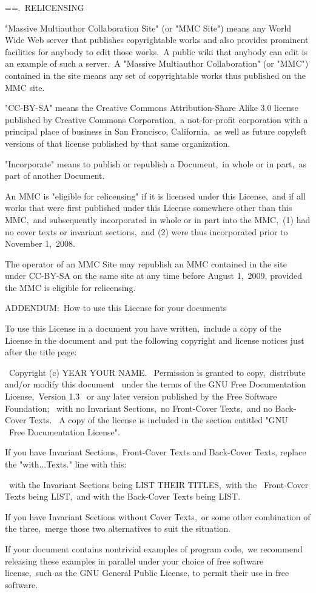 \documentclass{book}
\makeatletter
\newenvironment{Texinfopreformatted}{%
  \par\GNUTobeylines\obeyspaces\frenchspacing\parskip=\z@\parindent=\z@}{}
{\catcode`\^^M=13 \gdef\GNUTobeylines{\catcode`\^^M=13 \def^^M{\null\par}}}
\newenvironment{Texinfoindented}{\begin{list}{}{}\item\relax}{\end{list}}
\renewcommand{\_}{\Texinfounderscore\discretionary{}{}{}}
\makeatother
\begin{document}
\begin{Texinfoindented}
\begin{Texinfopreformatted}
11.\ RELICENSING

"Massive Multiauthor Collaboration Site" (or "MMC Site") means any
World Wide Web server that publishes copyrightable works and also
provides prominent facilities for anybody to edit those works.\  A
public wiki that anybody can edit is an example of such a server.\  A
"Massive Multiauthor Collaboration" (or "MMC") contained in the site
means any set of copyrightable works thus published on the MMC site.

"CC-BY-SA" means the Creative Commons Attribution-Share Alike 3.0
license published by Creative Commons Corporation,\ a not-for-profit
corporation with a principal place of business in San Francisco,
California,\ as well as future copyleft versions of that license
published by that same organization.

"Incorporate" means to publish or republish a Document,\ in whole or in
part,\ as part of another Document.

An MMC is "eligible for relicensing" if it is licensed under this
License,\ and if all works that were first published under this License
somewhere other than this MMC,\ and subsequently incorporated in whole or
in part into the MMC,\ (1) had no cover texts or invariant sections,\ and
(2) were thus incorporated prior to November 1,\ 2008.

The operator of an MMC Site may republish an MMC contained in the site
under CC-BY-SA on the same site at any time before August 1,\ 2009,
provided the MMC is eligible for relicensing.


ADDENDUM:\ How to use this License for your documents

To use this License in a document you have written,\ include a copy of
the License in the document and put the following copyright and
license notices just after the title page:

\    Copyright (c)  YEAR  YOUR NAME.
\    Permission is granted to copy,\ distribute and/or modify this document
\    under the terms of the GNU Free Documentation License,\ Version 1.3
\    or any later version published by the Free Software Foundation;
\    with no Invariant Sections,\ no Front-Cover Texts,\ and no Back-Cover Texts.
\    A copy of the license is included in the section entitled "GNU
\    Free Documentation License".

If you have Invariant Sections,\ Front-Cover Texts and Back-Cover Texts,
replace the "with...Texts." line with this:

\    with the Invariant Sections being LIST THEIR TITLES,\ with the
\    Front-Cover Texts being LIST,\ and with the Back-Cover Texts being LIST.

If you have Invariant Sections without Cover Texts,\ or some other
combination of the three,\ merge those two alternatives to suit the
situation.

If your document contains nontrivial examples of program code,\ we
recommend releasing these examples in parallel under your choice of
free software license,\ such as the GNU General Public License,
to permit their use in free software.
\end{Texinfopreformatted}
\end{Texinfoindented}
\end{document}
